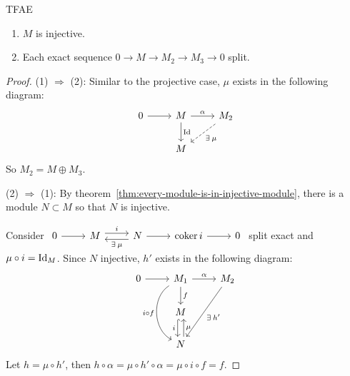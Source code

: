 \begin{prop}
  TFAE
  \begin{enumerate}
    \item $M$ is injective.
    \item Each exact sequence $0 \to M \to M_2 \to M_3 \to 0$ split.
  \end{enumerate}
  \begin{proof}
    (1) $\Rightarrow$ (2): Similar to the projective case, $\mu$ exists
    in the following diagram:
    \[
    \begin{tikzcd}
      0 \ar[r] & M \ar[r, "\alpha"] \ar[d, "\Id"] & M_2 \ar[dl, "\exists
      \mu", dashed] \\
               & M
    \end{tikzcd}
    \]
    So $M_2 = M \oplus M_3$.

    (2) $\Rightarrow$ (1):
    By theorem~\ref{thm:every-module-is-in-injective-module},
    there is a module $N \subset M$ so that $N$ is injective.

    Consider
    $
    \begin{tikzcd}
    0 \ar[r] & M \ar[r, "i", yshift=0.7ex] &  N \ar[r] \ar[l, "\exists \mu", 
      yshift=-0.7ex] & \coker i \ar[r]& 0
    \end{tikzcd}
    $
    split exact and $\mu \circ i = {\rm Id}_M$. Since $N$ injective,
    $h'$ exists in the following diagram:
    $$
    \begin{tikzcd}
      0 \ar[r] & M_1 \ar[r, "\alpha"] \ar[d , "f"] \ar[dd, "i 
      \circ f" swap, bend right = 60] & M_2 \ar[ddl, "\exists h'"]\\
               & M \ar[d, xshift=-0.7ex, "i" swap , hook] \\
               & N \ar[u, xshift=0.7ex, "\mu" swap]
    \end{tikzcd}
    $$
    Let $h = \mu \circ h'$, then $h \circ \alpha = \mu \circ h' 
    \circ \alpha = \mu \circ i \circ f = f$.
  \end{proof}
\end{prop}


